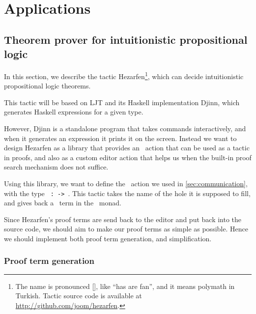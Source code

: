 \chapter{Applications} \label{chap:applications}

\section{Theorem prover for intuitionistic propositional logic}\label{sec:hezarfen}

In this section, we describe the tactic Hezarfen\footnote{ The name is
  pronounced {[]}, like ``has are fan'', and it means
    polymath in Turkish.  Tactic source code is available at
    \url{http://github.com/joom/hezarfen}.}, which can decide intuitionistic
propositional logic theorems.

This tactic will be based on LJT\cite{ljt} and its Haskell
implementation Djinn\cite{djinn}, which generates Haskell expressions
for a given type.

However, Djinn is a standalone program that takes commands
interactively, and when it generates an expression it prints it on the screen.
Instead we want to design Hezarfen as a library that provides an \Elab\ action
that can be used as a tactic in proofs, and also as a custom editor action that
helps us when the built-in proof search mechanism does not suffice.

Using this library, we want to define the \Elab\ action we used in
\autoref{sec:communication}, with the type
\texttt{ :  ->  }.
This tactic takes the name of the hole it is supposed to fill, and gives back a
\TT\ term in the \Elab\ monad.

Since Hezarfen's proof terms are send back to the editor and put back into the
source code, we should aim to make our proof terms as simple as possible.
Hence we should implement both proof term generation, and simplification.

\subsection{Proof term generation}



